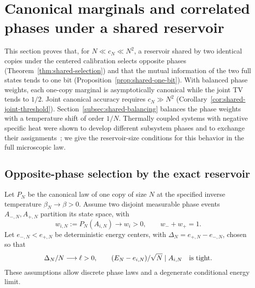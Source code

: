 \section{Canonical marginals and correlated phases under a shared reservoir}
\label{sec:shared-baths}

This section proves that, for $N\ll c_N\ll N^2$, a reservoir shared
by two identical copies under the centered calibration selects
opposite phases (Theorem~\ref{thm:shared-selection}) and that the
mutual information of the two full states tends to one bit
(Proposition~\ref{prop:shared-one-bit}). With balanced phase weights,
each one-copy marginal is asymptotically canonical while the joint TV
tends to $1/2$. Joint canonical accuracy requires $c_N\gg N^2$
(Corollary~\ref{cor:shared-joint-threshold}).
Section~\ref{subsec:shared-balancing} balances the phase weights with
a temperature shift of order $1/N$.
Thermally coupled systems with negative specific heat were shown to
develop different subsystem phases and to exchange their
assignments~\cite{RamirezHernandezLarraldeLeyvraz2008}; we give the
reservoir-size conditions for this behavior in the full microscopic
law.

\subsection{Opposite-phase selection by the exact reservoir}

Let $P_N$ be the canonical law of one copy of size $N$ at the
specified inverse temperature $\beta_N\to\beta>0$. Assume two disjoint
measurable phase events $A_{-,N},A_{+,N}$ partition its state space,
with
\begin{equation}
 w_{i,N}:=P_N(A_{i,N})\longrightarrow w_i>0,
 \qquad w_-+w_+=1.
 \label{eq:shared-phase-weights}
\end{equation}
Let $e_{-,N}<e_{+,N}$ be deterministic energy centers, with
$\Delta_N=e_{+,N}-e_{-,N}$, chosen so that
\begin{equation}
 \Delta_N/N\longrightarrow\ell>0,\qquad
 (E_N-e_{i,N})/\sqrt N\mid A_{i,N}\quad\hbox{is tight}.
 \label{eq:shared-tightness}
\end{equation}
These assumptions allow discrete phase laws and a degenerate
conditional energy limit.

